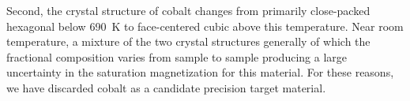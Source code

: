 \documentclass[preprint,12pt]{elsarticle}
\begin{document}
Second, the crystal structure of cobalt changes from primarily close-packed hexagonal below 690~K to face-centered cubic above this temperature. Near room temperature, a mixture of the two crystal structures generally of which the fractional composition varies from sample to sample producing a large uncertainty in the saturation magnetization for this material\cite{Myers1951}. For these reasons, we have discarded cobalt as a candidate precision target material.


\FloatBarrier
\newpage
\end{document}
